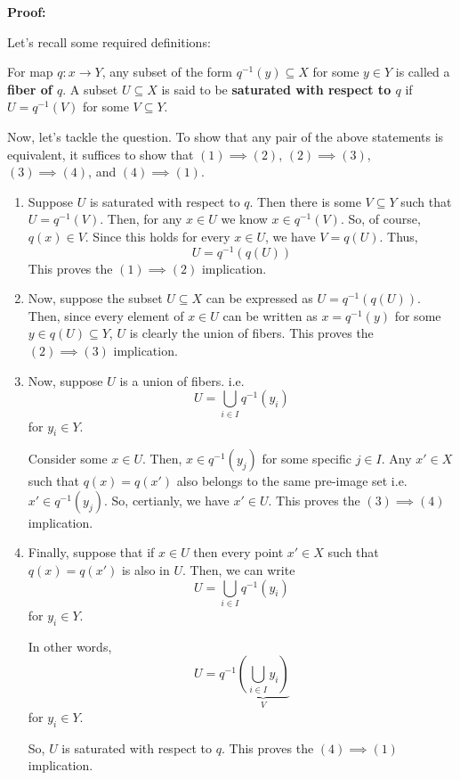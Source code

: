 \documentclass{article}
\begin{document}
\vskip 0.5cm

\textbf{Proof:} 

Let's recall some required definitions:

\vskip 0.5cm
For map $q : x \rightarrow Y$, any subset of the form $q^{-1}(y) \subseteq X$ for some $y \in Y$ is called a \textbf{fiber of $q$}. A subset $U \subseteq X$ is said to be \textbf{saturated with respect to $q$} if $U = q^{-1}(V)$ for some $V \subseteq Y$.

\vskip 0.5cm
Now, let's tackle the question. To show that any pair of the above statements is equivalent, it suffices to show that $(1) \implies (2)$, $(2) \implies (3)$, $(3) \implies (4)$, and $(4) \implies (1)$.

\begin{enumerate}
  \item Suppose $U$ is saturated with respect to $q$. Then there is some $V \subseteq Y$ such that $U = q^{-1}(V)$. Then, for any $x \in U$ we know $x \in q^{-1}(V)$. So, of course, $q(x) \in V$. Since this holds for every $x \in U$, we have $V = q(U)$. Thus,
  \[ U = q^{-1}(q(U)) \]
  This proves the $(1) \implies (2)$ implication.
  \vskip 0.5cm

  \item Now, suppose the subset $U \subseteq X$ can be expressed as $U = q^{-1}(q(U))$. Then, since every element of $x \in U$ can be written as $x = q^{-1}(y)$ for some $y \in q(U) \subseteq Y$, $U$ is clearly the union of fibers. 
  This proves the $(2) \implies (3)$ implication.
  \vskip 0.5cm

  \item Now, suppose $U$ is a union of fibers. i.e. 
  \[ U = \bigcup_{i \in I} q^{-1}(y_i) \] for $y_i \in Y$.

  Consider some $x \in U$. Then, $x \in q^{-1}(y_j)$ for some specific $j \in I$. Any $x' \in X$ such that $q(x) = q(x')$ also belongs to the same pre-image set i.e. $x' \in q^{-1}(y_j)$. So, certianly, we have $x' \in U$. This proves the $(3) \implies (4)$ implication.
  \vskip 0.5cm

  \item Finally, suppose that if $x \in U$ then every point $x' \in X$ such that $q(x) = q(x')$ is also in $U$. Then, we can write
  \[ U = \bigcup_{i \in I} q^{-1}(y_i) \] for $y_i \in Y$.
  
  In other words,
  \[ U = q^{-1} \underbrace{\left(\bigcup_{i \in I} y_i \right)}_{V} \] for $y_i \in Y$.
  
  So, $U$ is saturated with respect to $q$. This proves the $(4) \implies (1)$ implication. 
\end{enumerate}
\end{document}
